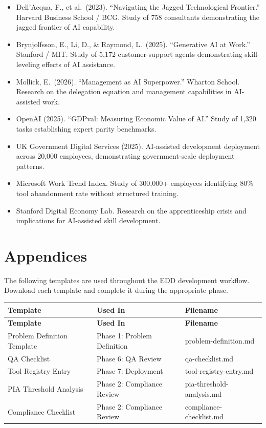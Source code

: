 \documentclass[11pt,letterpaper]{article}
\begin{document}
\begin{itemize}
  \item Dell'Acqua, F., et al.\ (2023). ``Navigating the Jagged Technological Frontier.'' Harvard Business School / BCG. Study of 758 consultants demonstrating the jagged frontier of AI capability.
  \item Brynjolfsson, E., Li, D., \& Raymond, L.\ (2025). ``Generative AI at Work.'' Stanford / MIT. Study of 5,172 customer-support agents demonstrating skill-leveling effects of AI assistance.
  \item Mollick, E.\ (2026). ``Management as AI Superpower.'' Wharton School. Research on the delegation equation and management capabilities in AI-assisted work.
  \item OpenAI (2025). ``GDPval: Measuring Economic Value of AI.'' Study of 1,320 tasks establishing expert parity benchmarks.
  \item UK Government Digital Services (2025). AI-assisted development deployment across 20,000 employees, demonstrating government-scale deployment patterns.
  \item Microsoft Work Trend Index. Study of 300,000+ employees identifying 80\% tool abandonment rate without structured training.
  \item Stanford Digital Economy Lab. Research on the apprenticeship crisis and implications for AI-assisted skill development.
\end{itemize}

\section{Appendices}
\label{sec:appendices}

The following templates are used throughout the EDD development workflow. Download
each template and complete it during the appropriate phase.

\begin{longtable}{@{}p{4cm}p{4.5cm}p{5cm}@{}}
\toprule
\textbf{Template} & \textbf{Used In} & \textbf{Filename} \\
\midrule
\endfirsthead
\toprule
\textbf{Template} & \textbf{Used In} & \textbf{Filename} \\
\midrule
\endhead
\bottomrule
\endlastfoot
Problem Definition Template & Phase 1: Problem Definition & problem-definition.md \\
\midrule
QA Checklist & Phase 6: QA Review & qa-checklist.md \\
\midrule
Tool Registry Entry & Phase 7: Deployment & tool-registry-entry.md \\
\midrule
PIA Threshold Analysis & Phase 2: Compliance Review & pia-threshold-analysis.md \\
\midrule
Compliance Checklist & Phase 2: Compliance Review & compliance-checklist.md \\
\end{longtable}
\end{document}
